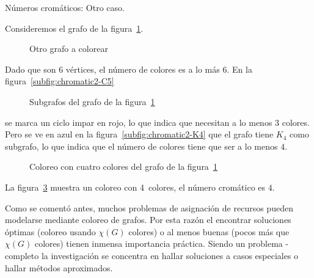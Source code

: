   \begin{example}
    Números cromáticos: Otro caso.

    Consideremos el grafo de la figura~\ref{fig:chromatic2}.
    \begin{figure}
      \centering
      \caption{Otro grafo a colorear}
      \label{fig:chromatic2}
    \end{figure}

    Dado que son \(6\) vértices,
    el número de colores es a lo más \(6\).
    En la figura~\ref{subfig:chromatic2-C5}
    \begin{figure}[htbp]
      \centering
      \hspace{2.5em}%
      \caption{Subgrafos del grafo
	       de la figura~\ref{fig:chromatic2}}
      \label{fig:chromatic2-subgrafos}
    \end{figure}
    se marca un ciclo impar en rojo,
    lo que indica que necesitan a lo menos \(3\) colores.
    Pero se ve en azul en la figura~\ref{subfig:chromatic2-K4}
    que el grafo tiene \(K_4\) como subgrafo,
    lo que indica que el número de colores
    tiene que ser a lo menos \(4\).
    \begin{figure}[htbp]
      \centering
      \caption{Coloreo con cuatro colores
	       del grafo de la figura~\ref{fig:chromatic2}}
      \label{fig:chromatic2-coloreo}
    \end{figure}
    La figura~\ref{fig:chromatic2-coloreo}
    muestra un coloreo con 4~colores,
    el número cromático es \(4\).
  \end{example}

  Como se comentó antes,
  muchos problemas de asignación de recursos
  pueden modelarse mediante coloreo de grafos.
  Por esta razón el encontrar soluciones óptimas
  (coloreo usando \(\chi(G)\) colores)
  o al menos buenas
  (pocos más que \(\chi(G)\) colores)
  tienen inmensa importancia práctica.
  Siendo un problema \NP\nobreakdash-completo%
  la investigación
  se concentra en hallar soluciones a casos especiales
  o hallar métodos aproximados.

